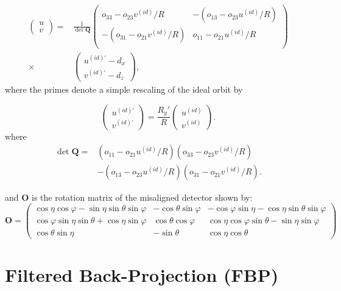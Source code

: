 \begin{equation}\label{eq:nonidealUVpoints}
\begin{split}
\begin{pmatrix}
u \\ v 
\end{pmatrix} = & \frac{1}{\det \mathbf{Q}} 
\begin{pmatrix}
o_{33}-o_{23}v^{(id)}/R & -(o_{13} - o_{23} u^{(id)}/R) \\
-(o_{31} - o_{21} v^{(id)}/R) & o_{11}-o_{21} u^{(id)}/R \\
\end{pmatrix} \\
\times & 
\begin{pmatrix}
u^{(id)'} - d_x \\
v^{(id)'} - d_z 
\end{pmatrix},
\end{split}
\end{equation}
where the primes denote a simple rescaling of the ideal orbit by

\begin{equation}
\begin{pmatrix}
u^{(id)'} \\ v^{(id)'}
\end{pmatrix}
= \frac{R_y'}{R}
\begin{pmatrix}
u^{(id)} \\ v^{(id)}
\end{pmatrix}.
\end{equation}
where
\begin{equation}
\begin{split}
\det \mathbf{Q} =& (o_{11} - o_{21} u^{(id)}/R)(o_{33}-o_{23}v^{(id)}/R) \\
& -(o_{13}-o_{23}u^{(id)}/R)(o_{31}-o_{21} v^{(id)}/R).
\end{split}
\end{equation}

and $\mathbf{O}$ is the rotation matrix of the misaligned detector shown by:
\begin{equation}
\mathbf{O} = 
\begin{pmatrix}
\cos \eta \cos \varphi - \sin \eta \sin \theta \sin \varphi & -\cos \theta \sin \varphi & -\cos \varphi \sin \eta - \cos \eta \sin \theta \sin \varphi \\
\cos \varphi \sin \eta \sin \theta + \cos \eta \sin \varphi & \cos \theta \cos \varphi & \cos \eta \cos \varphi \sin \theta - \sin \eta \sin \varphi \\
\cos \theta \sin \eta & -\sin \theta & \cos \eta \cos \theta
\end{pmatrix}
\end{equation}

\section{Filtered Back-Projection (FBP) }

